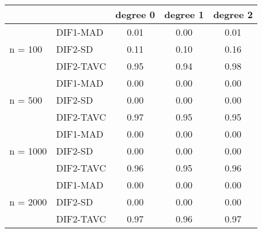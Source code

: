 \begin{tabular}{|l|l|c|c|c|}
  \hline
 &  & degree 0 & degree 1 & degree 2 \\ 
  \hline
 & DIF1-MAD & 0.01 & 0.00 & 0.01 \\ 
  n = 100 & DIF2-SD & 0.11 & 0.10 & 0.16 \\ 
   & DIF2-TAVC & 0.95 & 0.94 & 0.98 \\ 
   & DIF1-MAD & 0.00 & 0.00 & 0.00 \\ 
  n = 500 & DIF2-SD & 0.00 & 0.00 & 0.00 \\ 
   & DIF2-TAVC & 0.97 & 0.95 & 0.95 \\ 
   & DIF1-MAD & 0.00 & 0.00 & 0.00 \\ 
  n = 1000 & DIF2-SD & 0.00 & 0.00 & 0.00 \\ 
   & DIF2-TAVC & 0.96 & 0.95 & 0.96 \\ 
   & DIF1-MAD & 0.00 & 0.00 & 0.00 \\ 
  n = 2000 & DIF2-SD & 0.00 & 0.00 & 0.00 \\ 
   & DIF2-TAVC & 0.97 & 0.96 & 0.97 \\ 
   \hline
\end{tabular}
